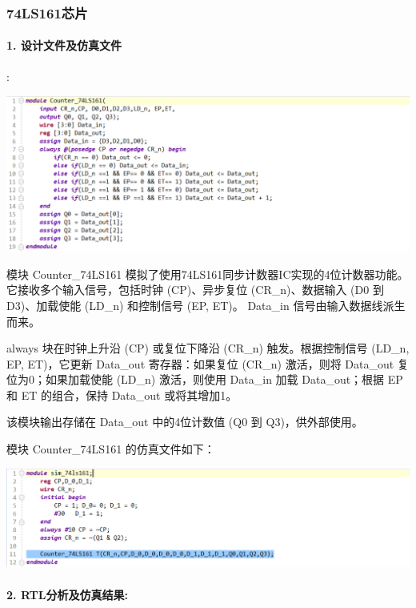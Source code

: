 \documentclass[a4,10pt,zihao=-4]{ctexart}
\begin{document}
\subsubsection{74LS161芯片}

\paragraph{1. 设计文件及仿真文件}:

\vspace{1em}
\noindent\includegraphics[width=1\textwidth]{Counter_74LS161_code.png}

模块 Counter\_74LS161 模拟了使用74LS161同步计数器IC实现的4位计数器功能。它接收多个输入信号，包括时钟 (CP)、异步复位 (CR\_n)、数据输入 (D0 到 D3)、加载使能 (LD\_n) 和控制信号 (EP, ET)。 Data\_in 信号由输入数据线派生而来。

always 块在时钟上升沿 (CP) 或复位下降沿 (CR\_n) 触发。根据控制信号 (LD\_n, EP, ET)，它更新 Data\_out 寄存器：如果复位 (CR\_n) 激活，则将 Data\_out 复位为0；如果加载使能 (LD\_n) 激活，则使用 Data\_in 加载 Data\_out；根据 EP 和 ET 的组合，保持 Data\_out 或将其增加1。

该模块输出存储在 Data\_out 中的4位计数值 (Q0 到 Q3)，供外部使用。


模块 Counter\_74LS161 的仿真文件如下：

\vspace{1em}
\noindent\includegraphics[width=1\textwidth]{sim_74LS161_code.png}

\paragraph{2. RTL分析及仿真结果:}
\end{document}
